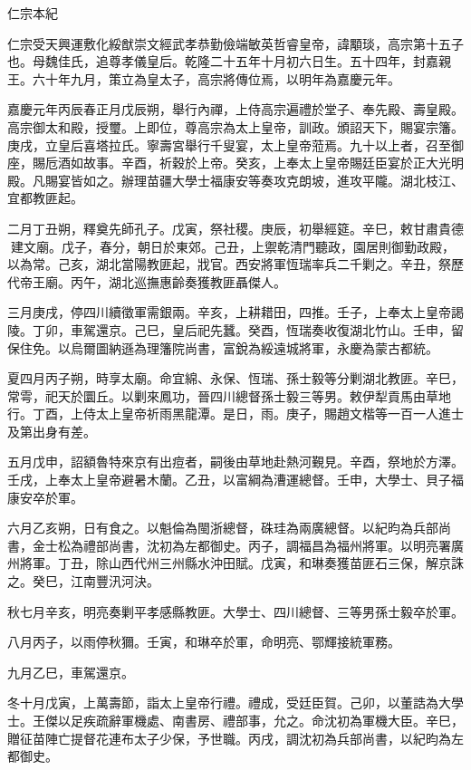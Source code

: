 
\begin{pinyinscope}
仁宗本紀

仁宗受天興運敷化綏猷崇文經武孝恭勤儉端敏英哲睿皇帝，諱顒琰，高宗第十五子也。母魏佳氏，追尊孝儀皇后。乾隆二十五年十月初六日生。五十四年，封嘉親王。六十年九月，策立為皇太子，高宗將傳位焉，以明年為嘉慶元年。

嘉慶元年丙辰春正月戊辰朔，舉行內禪，上侍高宗遍禮於堂子、奉先殿、壽皇殿。高宗御太和殿，授璽。上即位，尊高宗為太上皇帝，訓政。頒詔天下，賜宴宗籓。庚戌，立皇后喜塔拉氏。寧壽宮舉行千叟宴，太上皇帝蒞焉。九十以上者，召至御座，賜卮酒如故事。辛酉，祈穀於上帝。癸亥，上奉太上皇帝賜廷臣宴於正大光明殿。凡賜宴皆如之。辦理苗疆大學士福康安等奏攻克朗坡，進攻平隴。湖北枝江、宜都教匪起。

二月丁丑朔，釋奠先師孔子。戊寅，祭社稷。庚辰，初舉經筵。辛巳，敕甘肅貴德建文廟。戊子，春分，朝日於東郊。己丑，上禦乾清門聽政，園居則御勤政殿，以為常。己亥，湖北當陽教匪起，戕官。西安將軍恆瑞率兵二千剿之。辛丑，祭歷代帝王廟。丙午，湖北巡撫惠齡奏獲教匪聶傑人。

三月庚戌，停四川續徵軍需銀兩。辛亥，上耕耤田，四推。壬子，上奉太上皇帝謁陵。丁卯，車駕還京。己巳，皇后祀先蠶。癸酉，恆瑞奏收復湖北竹山。壬申，留保住免。以烏爾圖納遜為理籓院尚書，富銳為綏遠城將軍，永慶為蒙古都統。

夏四月丙子朔，時享太廟。命宜綿、永保、恆瑞、孫士毅等分剿湖北教匪。辛巳，常雩，祀天於圜丘。以剿來鳳功，晉四川總督孫士毅三等男。敕伊犁貢馬由草地行。丁酉，上侍太上皇帝祈雨黑龍潭。是日，雨。庚子，賜趙文楷等一百一人進士及第出身有差。

五月戊申，詔額魯特來京有出痘者，嗣後由草地赴熱河覲見。辛酉，祭地於方澤。壬戌，上奉太上皇帝避暑木蘭。乙丑，以富綱為漕運總督。壬申，大學士、貝子福康安卒於軍。

六月乙亥朔，日有食之。以魁倫為閩浙總督，硃珪為兩廣總督。以紀昀為兵部尚書，金士松為禮部尚書，沈初為左都御史。丙子，調福昌為福州將軍。以明亮署廣州將軍。丁丑，除山西代州三州縣水沖田賦。戊寅，和琳奏獲苗匪石三保，解京誅之。癸巳，江南豐汛河決。

秋七月辛亥，明亮奏剿平孝感縣教匪。大學士、四川總督、三等男孫士毅卒於軍。

八月丙子，以雨停秋獮。壬寅，和琳卒於軍，命明亮、鄂輝接統軍務。

九月乙巳，車駕還京。

冬十月戊寅，上萬壽節，詣太上皇帝行禮。禮成，受廷臣賀。己卯，以董誥為大學士。王傑以足疾疏辭軍機處、南書房、禮部事，允之。命沈初為軍機大臣。辛巳，贈征苗陣亡提督花連布太子少保，予世職。丙戌，調沈初為兵部尚書，以紀昀為左都御史。


\end{pinyinscope}
